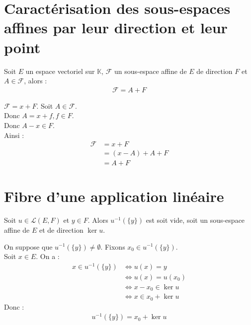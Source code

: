\documentclass[../main.tex]{subfiles}
\begin{document}
\section{Caractérisation des sous-espaces affines par leur direction et leur point}
\begin{tcolorbox}[title=Théorème 23.8, title filled=false, colframe=orange, colback=orange!10!white]
    Soit $E$ un espace vectoriel sur $\mathbb{K}$, $\mathcal{F}$ un sous-espace affine de $E$ de direction $F$ et $A\in \mathcal{F}$, alors : 
    \begin{align*}
        \mathcal{F} = A + F
    \end{align*}
\end{tcolorbox}

\noindent $\mathcal{F} = x + F$. Soit $A \in \mathcal{F}$. \\
Donc $A = x + f, f \in F$. \\
Donc $A - x \in F$. \\
Ainsi : 
\begin{align*}
    \mathcal{F} &= x + F \\
    &= (x-A) + A + F \\
    &= A + F
\end{align*}

\section{Fibre d'une application linéaire}
\begin{tcolorbox}[title=Théorème 23.11, title filled=false, colframe=orange, colback=orange!10!white]
    Soit $u\in \mathcal{L}(E, F)$ et $y\in F$. Alors $u^{-1}(\{y\})$ est soit vide, soit un sous-espace affine de $E$ et de direction $\ker u$. 
\end{tcolorbox}

\noindent On suppose que $u^{-1}(\{y\}) \neq \emptyset$. Fixons $x_0 \in u^{-1}(\{y\})$. \\
Soit $x\in E$. On a : 
\begin{align*}
    x\in u^{-1}(\{y\}) &\Leftrightarrow u(x) = y \\
    &\Leftrightarrow u(x) = u(x_0) \\
    &\Leftrightarrow x-x_0 \in \ker u \\
    &\Leftrightarrow x \in x_0 + \ker u
\end{align*}
Donc : 
\begin{align*}
    u^{-1}(\{y\}) = x_0 + \ker u
\end{align*}
\end{document}
